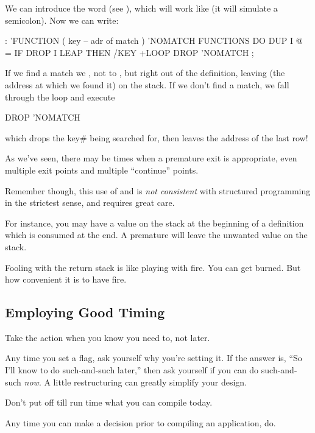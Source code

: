 We can introduce the word  (see ), which will work
like  (it will simulate a semicolon). Now we can write:

\begin{Code}
: 'FUNCTION  ( key -- adr of match )
   'NOMATCH FUNCTIONS DO  DUP  I @ =  IF  DROP I LEAP
   THEN  /KEY +LOOP  DROP  'NOMATCH ;
\end{Code}
If we find a match we , not to , but right out
of the definition, leaving  (the address at which we found it) on
the stack. If we don't find a match, we fall through the loop and execute

\begin{Code}
DROP  'NOMATCH
\end{Code}
which drops the key\# being searched for, then leaves the address of the
last row!

As we've seen, there may be times when a premature exit is appropriate,
even multiple exit points and multiple ``continue'' points.

Remember though, this use of  and  is
\emph{not consistent} with structured programming in the strictest sense,
and requires great care.

For instance, you may have a value on the stack at the beginning of a
definition which is consumed at the end. A premature  will
leave the unwanted value on the stack.

Fooling with the return stack is like playing with fire. You can get
burned. But how convenient it is to have fire.%
%

\subsection{Employing Good Timing}%

\begin{tip}
Take the action when you know you need to, not later.
\end{tip}
Any time you set a flag, ask yourself why you're setting it. If the answer
is, ``So I'll know to do such-and-such later,'' then ask yourself if you
can do such-and-such \emph{now}. A little restructuring can greatly
simplify your design.

\begin{tip}
Don't put off till run time what you can compile today.
\end{tip}
Any time you can make a decision prior to compiling an application, do.

